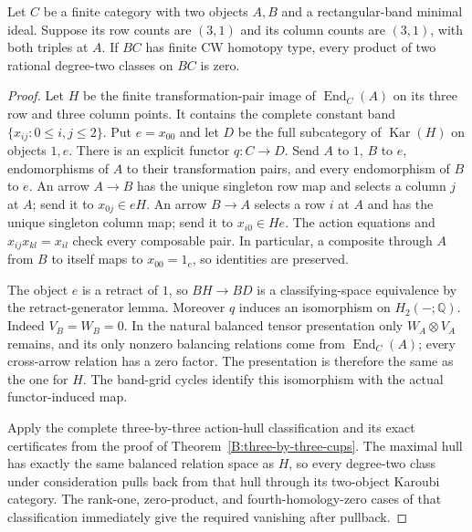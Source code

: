 \begin{proposition}\label{C:one-active-three-by-three}
Let $C$ be a finite category with two objects $A,B$ and a
rectangular-band minimal ideal.  Suppose its row counts are
$(3,1)$ and its column counts are $(3,1)$, with both triples at
$A$.  If $BC$ has finite CW homotopy type, every product of two
rational degree-two classes on $BC$ is zero.
\end{proposition}
\begin{proof}
Let $H$ be the finite transformation-pair image of
$\operatorname{End}_C(A)$ on its three row and three column
points.  It contains the complete constant band
$\{x_{ij}:0\leq i,j\leq2\}$.  Put $e=x_{00}$ and let
$D$ be the full subcategory of $\operatorname{Kar}(H)$ on
objects $1,e$.
There is an explicit functor $q:C\to D$.
Send $A$ to $1$, $B$ to $e$, endomorphisms of $A$ to their
transformation pairs, and every endomorphism of $B$ to $e$.
An arrow $A\to B$ has the unique singleton row map and selects
a column $j$ at $A$; send it to $x_{0j}\in eH$.
An arrow $B\to A$ selects a row $i$ at $A$ and has the unique
singleton column map; send it to $x_{i0}\in He$.
The action equations and $x_{ij}x_{kl}=x_{il}$ check every
composable pair.  In particular, a composite through $A$ from
$B$ to itself maps to $x_{00}=1_e$, so identities are preserved.

The object $e$ is a retract of $1$, so $BH\to BD$ is a
classifying-space equivalence by the retract-generator lemma.
Moreover $q$ induces an isomorphism on $H_2(-;\mathbb Q)$.
Indeed $V_B=W_B=0$.  In the natural balanced tensor presentation
only $W_A\otimes V_A$ remains, and its only nonzero balancing
relations come from $\operatorname{End}_C(A)$; every cross-arrow
relation has a zero factor.  The presentation is therefore the
same as the one for $H$.  The band-grid cycles identify this
isomorphism with the actual functor-induced map.

Apply the complete three-by-three action-hull classification and
its exact certificates from the proof of
Theorem~\ref{B:three-by-three-cups}.  The maximal hull has exactly
the same balanced relation space as $H$, so every degree-two
class under consideration pulls back from that hull through
its two-object Karoubi category.  The rank-one, zero-product,
and fourth-homology-zero cases of that classification immediately
give the required vanishing after pullback.


\end{proof}
